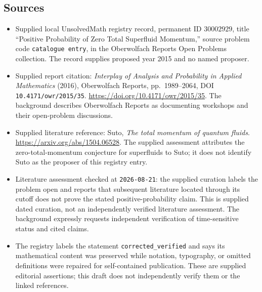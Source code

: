 \documentclass[11pt]{article}
\begin{document}
\subsection{Sources}
\begin{itemize}
\item Supplied local UnsolvedMath registry record, permanent ID \(30002929\), title ``Positive Probability of Zero Total Superfluid Momentum,'' source problem code \texttt{catalogue entry}, in the Oberwolfach Reports Open Problems collection. The record supplies proposed year 2015 and no named proposer.
\item Supplied report citation: \emph{Interplay of Analysis and Probability in Applied Mathematics} (2016), Oberwolfach Reports, pp.\ 1989--2064, DOI \texttt{10.4171/owr/2015/35}. \url{https://doi.org/10.4171/owr/2015/35}. The background describes Oberwolfach Reports as documenting workshops and their open-problem discussions.
\item Supplied literature reference: Suto, \emph{The total momentum of quantum fluids}. \url{https://arxiv.org/abs/1504.06528}. The supplied assessment attributes the zero-total-momentum conjecture for superfluids to Suto; it does not identify Suto as the proposer of this registry entry.
\item Literature assessment checked at \texttt{2026-08-21}: the supplied curation labels the problem open and reports that subsequent literature located through its cutoff does not prove the stated positive-probability claim. This is supplied dated curation, not an independently verified literature assessment. The background expressly requests independent verification of time-sensitive status and cited claims.
\item The registry labels the statement \texttt{corrected\_verified} and says its mathematical content was preserved while notation, typography, or omitted definitions were repaired for self-contained publication. These are supplied editorial assertions; this draft does not independently verify them or the linked references.
\end{itemize}
\end{document}
